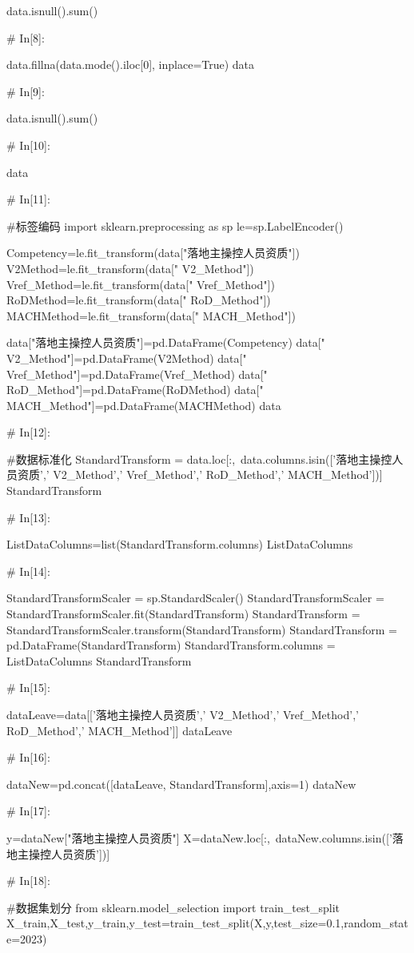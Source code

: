 \documentclass{MathorCupModeling}
\begin{document}
\begin{python}
data.isnull().sum()


# In[8]:


data.fillna(data.mode().iloc[0], inplace=True)
data


# In[9]:


data.isnull().sum()


# In[10]:


data


# In[11]:


#标签编码
import sklearn.preprocessing as sp
le=sp.LabelEncoder()

Competency=le.fit_transform(data["落地主操控人员资质"])
V2Method=le.fit_transform(data[" V2_Method"])
Vref_Method=le.fit_transform(data[" Vref_Method"])
RoDMethod=le.fit_transform(data[" RoD_Method"])
MACHMethod=le.fit_transform(data[" MACH_Method"])

data["落地主操控人员资质"]=pd.DataFrame(Competency)
data[" V2_Method"]=pd.DataFrame(V2Method)
data[" Vref_Method"]=pd.DataFrame(Vref_Method)
data[" RoD_Method"]=pd.DataFrame(RoDMethod)
data[" MACH_Method"]=pd.DataFrame(MACHMethod)
data


# In[12]:


#数据标准化
StandardTransform = data.loc[:,~data.columns.isin(['落地主操控人员资质',' V2_Method',' Vref_Method',' RoD_Method',' MACH_Method'])]
StandardTransform


# In[13]:


ListDataColumns=list(StandardTransform.columns)
ListDataColumns


# In[14]:


StandardTransformScaler = sp.StandardScaler()
StandardTransformScaler = StandardTransformScaler.fit(StandardTransform)
StandardTransform = StandardTransformScaler.transform(StandardTransform)
StandardTransform = pd.DataFrame(StandardTransform)
StandardTransform.columns = ListDataColumns
StandardTransform


# In[15]:


dataLeave=data[['落地主操控人员资质',' V2_Method',' Vref_Method',' RoD_Method',' MACH_Method']]
dataLeave


# In[16]:


dataNew=pd.concat([dataLeave, StandardTransform],axis=1)
dataNew


# In[17]:


y=dataNew["落地主操控人员资质"]
X=dataNew.loc[:,~dataNew.columns.isin(['落地主操控人员资质'])]


# In[18]:


#数据集划分
from sklearn.model_selection import train_test_split
X_train,X_test,y_train,y_test=train_test_split(X,y,test_size=0.1,random_state=2023)



\end{python}
\end{document}
